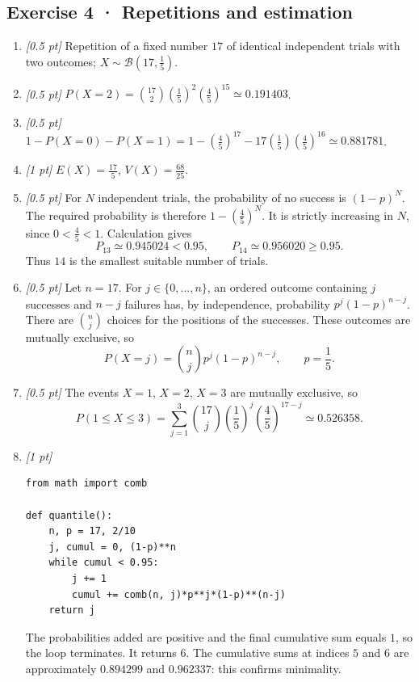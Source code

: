 \subsection*{Exercise 4 · Repetitions and estimation}\begin{enumerate}

\item \textit{[0.5 pt]} Repetition of a fixed number $17$ of identical independent trials with two outcomes; $X\sim\mathcal B(17,\frac{1}{5})$.

\item \textit{[0.5 pt]} $P(X=2)=\binom{17}2(\frac{1}{5})^2(\frac{4}{5})^{15}\simeq0.191403$.

\item \textit{[0.5 pt]} $1-P(X=0)-P(X=1)=1-(\frac{4}{5})^{17}-17(\frac{1}{5})(\frac{4}{5})^{16}\simeq0.881781$.

\item \textit{[1 pt]} $E(X)=\frac{17}{5}$, $V(X)=\frac{68}{25}$.

\item \textit{[0.5 pt]} For $N$ independent trials, the probability of no success is $(1-p)^N$. The required probability is therefore $1-(\frac{4}{5})^N$. It is strictly increasing in $N$, since $0<\frac{4}{5}<1$. Calculation gives
\[P_{13}\simeq0.945024<0.95,\qquad P_{14}\simeq0.956020\ge0.95.\]
Thus $14$ is the smallest suitable number of trials.

\item \textit{[0.5 pt]} Let $n=17$. For $j\in\{0,\ldots,n\}$, an ordered outcome containing $j$ successes and $n-j$ failures has, by independence, probability $p^j(1-p)^{n-j}$. There are $\binom nj$ choices for the positions of the successes. These outcomes are mutually exclusive, so
\[P(X=j)=\binom nj p^j(1-p)^{n-j},\qquad p=\frac{1}{5}.\]

\item \textit{[0.5 pt]} The events $X=1$, $X=2$, $X=3$ are mutually exclusive, so
\[P(1\le X\le3)=\sum_{j=1}^3\binom{17}j(\frac{1}{5})^j(\frac{4}{5})^{17-j}\simeq0.526358.\]


\item \textit{[1 pt]} 
\begin{lstlisting}
from math import comb

def quantile():
    n, p = 17, 2/10
    j, cumul = 0, (1-p)**n
    while cumul < 0.95:
        j += 1
        cumul += comb(n, j)*p**j*(1-p)**(n-j)
    return j
\end{lstlisting}
The probabilities added are positive and the final cumulative sum equals $1$, so the loop terminates. It returns $6$. The cumulative sums at indices $5$ and $6$ are approximately $0.894299$ and $0.962337$: this confirms minimality.

\end{enumerate}

